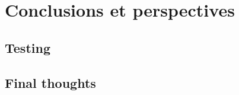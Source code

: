 %
\chapter{Conclusions et perspectives}
\label{sec:conclusion}




\section{Testing}
\label{sec:conclusion:testing}


\section{Final thoughts}
\label{sec:conclusion:final-thoughts}

